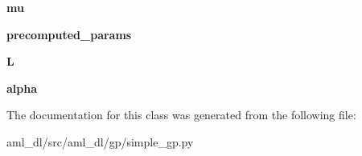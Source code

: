 \begin{DoxyCompactItemize}
\item 
\hypertarget{classsrc_1_1aml__dl_1_1gp_1_1simple__gp_1_1_gaussian_process_a2e92bb84ecb6108c0e1bc1bb6739c7ac}{{\bfseries mu}}\label{classsrc_1_1aml__dl_1_1gp_1_1simple__gp_1_1_gaussian_process_a2e92bb84ecb6108c0e1bc1bb6739c7ac}

\item 
\hypertarget{classsrc_1_1aml__dl_1_1gp_1_1simple__gp_1_1_gaussian_process_a766e5eb42ba4bc1cd56124119ae7b7f0}{{\bfseries precomputed\-\_\-params}}\label{classsrc_1_1aml__dl_1_1gp_1_1simple__gp_1_1_gaussian_process_a766e5eb42ba4bc1cd56124119ae7b7f0}

\item 
\hypertarget{classsrc_1_1aml__dl_1_1gp_1_1simple__gp_1_1_gaussian_process_af7e308a75a4a1f246dfb68f31bd5fbcd}{{\bfseries L}}\label{classsrc_1_1aml__dl_1_1gp_1_1simple__gp_1_1_gaussian_process_af7e308a75a4a1f246dfb68f31bd5fbcd}

\item 
\hypertarget{classsrc_1_1aml__dl_1_1gp_1_1simple__gp_1_1_gaussian_process_a4928c77a7843ab5117fd70dcf56fc6a5}{{\bfseries alpha}}\label{classsrc_1_1aml__dl_1_1gp_1_1simple__gp_1_1_gaussian_process_a4928c77a7843ab5117fd70dcf56fc6a5}

\end{DoxyCompactItemize}


The documentation for this class was generated from the following file\-:\begin{DoxyCompactItemize}
\item 
aml\-\_\-dl/src/aml\-\_\-dl/gp/simple\-\_\-gp.\-py\end{DoxyCompactItemize}
